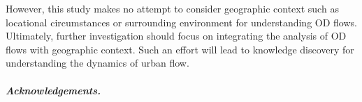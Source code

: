 \documentclass[a4paper,UKenglish]{lipics-v2016}
\begin{document}
However, this study makes no attempt to consider geographic context such as locational circumstances or surrounding environment for understanding OD flows. Ultimately, further investigation should focus on integrating the analysis of OD flows with geographic context. Such an effort will lead to knowledge discovery for understanding the dynamics of urban flow.


%
%
%
%
%




\subparagraph*{Acknowledgements.}






\end{document}
